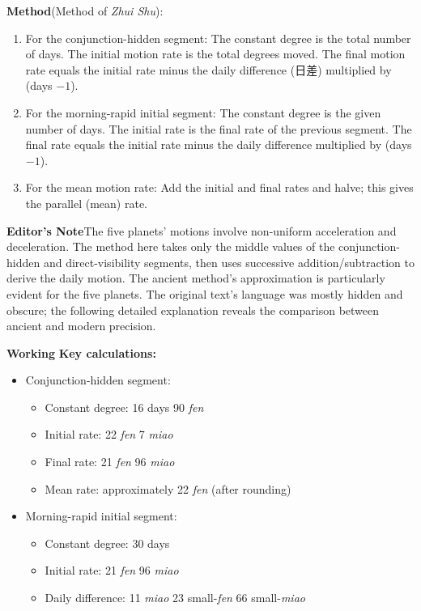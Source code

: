 \documentclass[11pt,a4paper]{article}
\newcommand{\ShuEN}{\textbf{\color{headcolor}Method}}
\newcommand{\CaoEN}{\textbf{\color{headcolor}Working}}
\newcommand{\AnEN}{\textbf{\color{headcolor}Editor's Note}}
\begin{document}
\vspace{0.5em}
\ShuEN{}\quad (Method of \textit{Zhui Shu}):
\begin{enumerate}[noitemsep,topsep=0pt]
  \item For the conjunction-hidden segment: The constant degree is the total number of days. The initial motion rate is the total degrees moved. The final motion rate equals the initial rate minus the daily difference (日差) multiplied by (days $-1$).
  \item For the morning-rapid initial segment: The constant degree is the given number of days. The initial rate is the final rate of the previous segment. The final rate equals the initial rate minus the daily difference multiplied by (days $-1$).
  \item For the mean motion rate: Add the initial and final rates and halve; this gives the parallel (mean) rate.
\end{enumerate}

\vspace{0.5em}
\AnEN{}\quad The five planets' motions involve non-uniform acceleration and deceleration. The method here takes only the middle values of the conjunction-hidden and direct-visibility segments, then uses successive addition/subtraction to derive the daily motion. The ancient method's approximation is particularly evident for the five planets. The original text's language was mostly hidden and obscure; the following detailed explanation reveals the comparison between ancient and modern precision.

\vspace{0.5em}
\CaoEN{}\quad
\textbf{Key calculations:}
\begin{itemize}[noitemsep,topsep=0pt]
  \item Conjunction-hidden segment:
    \begin{itemize}[topsep=0pt]
      \item Constant degree: 16 days 90 \textit{fen}
      \item Initial rate: 22 \textit{fen} 7 \textit{miao}
      \item Final rate: 21 \textit{fen} 96 \textit{miao}
      \item Mean rate: approximately 22 \textit{fen} (after rounding)
    \end{itemize}
  \item Morning-rapid initial segment:
    \begin{itemize}[topsep=0pt]
      \item Constant degree: 30 days
      \item Initial rate: 21 \textit{fen} 96 \textit{miao}
      \item Daily difference: 11 \textit{miao} 23 small-\textit{fen} 66 small-\textit{miao}
    \end{itemize}
\end{itemize}
\end{document}
